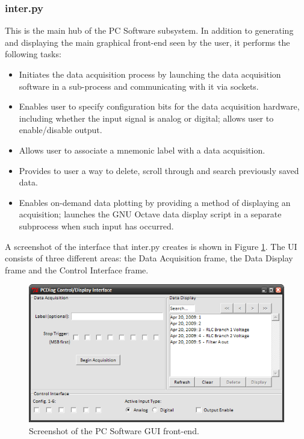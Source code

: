 \subsubsection[inter.py]{inter.py}
This is the main hub of the PC Software subsystem. In addition to generating and displaying the 
main graphical front-end seen by the user, it performs the following tasks:

\begin{itemize}
\item Initiates the data acquisition process by launching the data acquisition software in a 
sub-process and communicating with it via sockets.
\item Enables user to specify configuration bits for the data acquisition hardware, including 
whether the input signal is analog or digital; allows user to enable/disable output.
\item Allows user to associate a mnemonic label with a data acquisition.
\item Provides to user a way to delete, scroll through and search previously saved data.
\item Enables on-demand data plotting by providing a method of displaying an acquisition; launches 
the GNU Octave data display script in a separate subprocess when such input has occurred.
\end{itemize}


A screenshot of the interface that inter.py creates is shown in Figure \ref{fig:pcsoft inter ss}. The
UI consists of three different areas: the Data Acquisition frame, the Data Display frame and the
Control Interface frame.

\begin{figure}[bhp]
\begin{center}
\includegraphics[scale=0.6]{../drawings/pcsoft_inter_ss.png}
\end{center}
\caption[PC Software Interface Screenshot]{Screenshot of the PC Software GUI front-end.}
\label{fig:pcsoft inter ss}
\end{figure}



